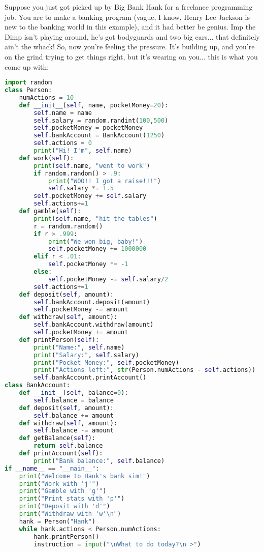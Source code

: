 \documentclass[12pt, twoside, reqno]{book}
\begin{document}
Suppose you just got picked up by Big Bank Hank for a freelance programming job. You are to make a banking program (vague, I know, Henry Lee Jackson is new to the banking world in this example), and it had better be genius. Imp the Dimp isn't playing around, he's got bodyguards and two big cars... that definitely ain't the whack! So, now you're feeling the pressure. It's building up, and you're on the grind trying to get things right, but it's wearing on you... this is what you come up with:
\begin{lstlisting}[language=Python]
import random
class Person:
    numActions = 10
    def __init__(self, name, pocketMoney=20):
        self.name = name
        self.salary = random.randint(100,500)
        self.pocketMoney = pocketMoney
        self.bankAccount = BankAccount(1250)
        self.actions = 0
        print("Hi! I'm", self.name)
    def work(self):
        print(self.name, "went to work")
        if random.random() > .9:
            print("WOO!! I got a raise!!!")
            self.salary *= 1.5
        self.pocketMoney += self.salary
        self.actions+=1
    def gamble(self):
        print(self.name, "hit the tables")
        r = random.random()
        if r > .999:
            print("We won big, baby!")
            self.pocketMoney += 1000000
        elif r < .01:
            self.pocketMoney *= -1
        else: 
            self.pocketMoney -= self.salary/2
        self.actions+=1
    def deposit(self, amount):
        self.bankAccount.deposit(amount)
        self.pocketMoney -= amount
    def withdraw(self, amount):
        self.bankAccount.withdraw(amount)
        self.pocketMoney += amount
    def printPerson(self):
        print("Name:", self.name)
        print("Salary:", self.salary)
        print("Pocket Money:", self.pocketMoney)
        print("Actions left:", str(Person.numActions - self.actions))
        self.bankAccount.printAccount()
class BankAccount:
    def __init__(self, balance=0):
        self.balance = balance
    def deposit(self, amount):
        self.balance += amount
    def withdraw(self, amount):
        self.balance -= amount
    def getBalance(self):
        return self.balance
    def printAccount(self):
        print("Bank balance:", self.balance)
if __name__ == "__main__":
    print("Welcome to Hank's bank sim!")
    print("Work with 'j'")
    print("Gamble with 'g'")
    print("Print stats with 'p'")
    print("Deposit with 'd'")
    print("Withdraw with 'w'\n")
    hank = Person("Hank")
    while hank.actions < Person.numActions:
        hank.printPerson()
        instruction = input("\nWhat to do today?\n >")

\end{lstlisting}
\end{document}
